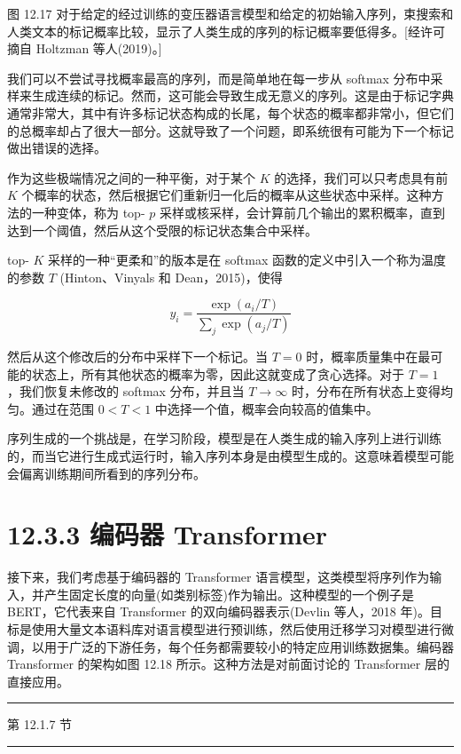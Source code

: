\documentclass[10pt]{report}
\newcommand{\HRule}{\begin{center}\rule{0.9\linewidth}{0.2mm}\end{center}}
\begin{document}
图 12.17 对于给定的经过训练的变压器语言模型和给定的初始输入序列，束搜索和人类文本的标记概率比较，显示了人类生成的序列的标记概率要低得多。[经许可摘自 Holtzman 等人(2019)。]

我们可以不尝试寻找概率最高的序列，而是简单地在每一步从 softmax 分布中采样来生成连续的标记。然而，这可能会导致生成无意义的序列。这是由于标记字典通常非常大，其中有许多标记状态构成的长尾，每个状态的概率都非常小，但它们的总概率却占了很大一部分。这就导致了一个问题，即系统很有可能为下一个标记做出错误的选择。

作为这些极端情况之间的一种平衡，对于某个 \(K\) 的选择，我们可以只考虑具有前 \(K\) 个概率的状态，然后根据它们重新归一化后的概率从这些状态中采样。这种方法的一种变体，称为 top- \(p\) 采样或核采样，会计算前几个输出的累积概率，直到达到一个阈值，然后从这个受限的标记状态集合中采样。

top- \(K\) 采样的一种“更柔和”的版本是在 softmax 函数的定义中引入一个称为温度的参数 \(T\) (Hinton、Vinyals 和 Dean，2015)，使得

\[
{y}_{i} = \frac{\exp \left( {{a}_{i}/T}\right) }{\mathop{\sum }\limits_{j}\exp \left( {{a}_{j}/T}\right) } \tag{12.35}
\]

然后从这个修改后的分布中采样下一个标记。当 \(T = 0\) 时，概率质量集中在最可能的状态上，所有其他状态的概率为零，因此这就变成了贪心选择。对于 \(T = 1\) ，我们恢复未修改的 softmax 分布，并且当 \(T \rightarrow  \infty\) 时，分布在所有状态上变得均匀。通过在范围 \(0 < T < 1\) 中选择一个值，概率会向较高的值集中。

序列生成的一个挑战是，在学习阶段，模型是在人类生成的输入序列上进行训练的，而当它进行生成式运行时，输入序列本身是由模型生成的。这意味着模型可能会偏离训练期间所看到的序列分布。

\section*{12.3.3 编码器 Transformer}

接下来，我们考虑基于编码器的 Transformer 语言模型，这类模型将序列作为输入，并产生固定长度的向量(如类别标签)作为输出。这种模型的一个例子是 BERT，它代表来自 Transformer 的双向编码器表示(Devlin 等人，2018 年)。目标是使用大量文本语料库对语言模型进行预训练，然后使用迁移学习对模型进行微调，以用于广泛的下游任务，每个任务都需要较小的特定应用训练数据集。编码器 Transformer 的架构如图 12.18 所示。这种方法是对前面讨论的 Transformer 层的直接应用。

\HRule

第 12.1.7 节

\HRule
\end{document}
